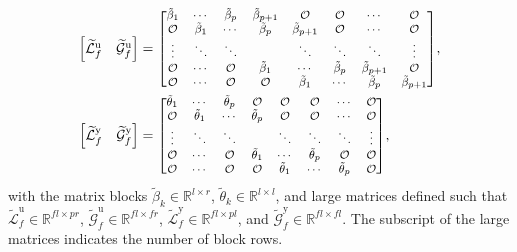 \begin{align*}
    \begin{bmatrix}
        \widetilde{\mathcal{L}}^\mathrm{u}_f & \widetilde{\mathcal{G}}^\mathrm{u}_f 
    \end{bmatrix}&= {\scriptsize
    \begin{bmatrix}
        \tilde{\beta}_1     & \cdots      & \tilde{\beta}_{p}   & \tilde{\beta}_{p+1} & \mathcal{O} & \mathcal{O} & \cdots      & \mathcal{O}\\
        \mathcal{O} & \tilde{\beta}_1     & \cdots      & \tilde{\beta}_{p}   & \tilde{\beta}_{p+1} & \mathcal{O} & \cdots      & \mathcal{O}\\
        \vdots      & \ddots      & \ddots      &             & \ddots      & \ddots      & \ddots      & \vdots     \\
        \mathcal{O} & \cdots      & \mathcal{O} & \tilde{\beta}_1     & \cdots      & \tilde{\beta}_{p}   & \tilde{\beta}_{p+1} & \mathcal{O}\\
        \mathcal{O} & \cdots      & \mathcal{O} & \mathcal{O} & \tilde{\beta}_1     & \cdots      & \tilde{\beta}_{p}   & \tilde{\beta}_{p+1}\\
    \end{bmatrix}},\\
    \begin{bmatrix}
        \widetilde{\mathcal{L}}^\mathrm{y}_f & \widetilde{\mathcal{G}}^\mathrm{y}_f 
    \end{bmatrix}&= {\scriptsize
    \begin{bmatrix}
        \tilde{\theta}_1    & \cdots      & \tilde{\theta}_{p}  & \mathcal{O}  & \mathcal{O}  & \mathcal{O} & \cdots       & \mathcal{O}\\
        \mathcal{O} & \tilde{\theta}_1    & \cdots      & \tilde{\theta}_{p}   & \mathcal{O}  & \mathcal{O} & \cdots       & \mathcal{O}\\
        \vdots      & \ddots      & \ddots      &              & \ddots       & \ddots      & \ddots       & \vdots     \\
        \mathcal{O} & \cdots      & \mathcal{O} & \tilde{\theta}_1     & \cdots       & \tilde{\theta}_{p}  & \mathcal{O}  & \mathcal{O}\\
        \mathcal{O} & \cdots      & \mathcal{O} & \mathcal{O}  & \tilde{\theta}_1     & \cdots      & \tilde{\theta}_{p}   & \mathcal{O}\\
    \end{bmatrix}},
\end{align*}
with the matrix blocks $\tilde{\beta}_k\in\mathbb{R}^{l\times r}$, $\tilde{\theta}_k\in\mathbb{R}^{l\times l}$, and large matrices defined such that $\widetilde{\mathcal{L}}^\mathrm{u}_f\in\mathbb{R}^{fl\times pr}$, $\widetilde{\mathcal{G}}^\mathrm{u}_f\in\mathbb{R}^{fl\times fr}$, $\widetilde{\mathcal{L}}^\mathrm{y}_f\in\mathbb{R}^{fl\times pl}$, and $\widetilde{\mathcal{G}}^\mathrm{y}_f\in\mathbb{R}^{fl\times fl}$. The subscript of the large matrices indicates the number of block rows.

